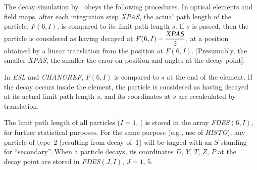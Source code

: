\noindent The decay simulation by \zgou\ obeys the following procedures.
In optical elements and field maps, after each integration step \textsl{XPAS}, the actual 
path length of the particle, $ F(6,I) $, is compared to its limit path length $ s$. 
 If $s $ is passed, then the particle is considered as having decayed at 
 $ F(6,I) - \dfrac{\text{\textsl{XPAS}} }{ 2} $, 
at a position obtained by a linear translation from the position at $ F(6,I)$.
[Presumably, the smaller \textsl{XPAS},  the smaller the error on position
and angles at the decay point].  
\bigskip
\begin{figure}[H]
{\setlength{\captionwidth}{15cm}
       }
\end{figure}

\noindent In   \textsl{ESL}   and  \textsl{CHANGREF},  
$ F(6,I) $ is compared to $ s $ at the
end of the element. If the decay occurs inside the element, the particle is considered as having 
decayed at its actual limit path length $ s$,  and its coordinates 
at $ s $ are recalculated by translation.  
\bigskip

\noindent The limit path length of all particles  ($I=1$, \IMAX{})   is stored in
the array  \textsl{FDES}$(6,I)$, for further statistical purposes. For the same purpose 
(e.g., use of \textsl{HISTO}), any particle of type~2 (resulting from decay of~1) 
will be tagged with an $ S $ standing for ``secondary''. When a particle decays, 
its coordinates $ D$, $Y$, $T$, $Z$, $P $ at the decay point are stored in  
\textsl{FDES}$(J,I)$, \mbox{$ J=1,\, 5$}.  
\bigskip

